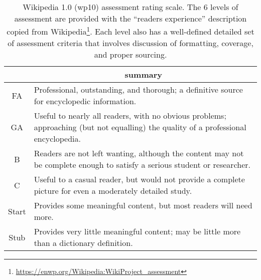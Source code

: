 \begin{table}
\centering
\caption{Wikipedia 1.0 (wp10) assessment rating scale. The 6 levels of assessment are provided with the ``readers experience'' description copied from Wikipedia\protect\footnote{\url{https://enwp.org/Wikipedia:WikiProject_assessment}}.  Each level also has a well-defined detailed set of assessment criteria that involves discussion of formatting, coverage, and proper sourcing.}
\begin{tabular}{|c|p{7cm}|} \hline
& \multicolumn{1}{|c|}{summary} \\
\hline
FA & Professional, outstanding, and thorough; a definitive source for
encyclopedic information.\\ \hline
GA & Useful to nearly all readers, with no obvious problems; approaching
(but not equalling) the quality of a professional
encyclopedia.\\ \hline
B & Readers are not left wanting, although the content may not be
complete enough to satisfy a serious student or
researcher.\\ \hline
C & Useful to a casual reader, but would not provide a complete picture
for even a moderately detailed study.\\ \hline
Start & Provides some meaningful content, but most readers will need
more.\\ \hline
Stub & Provides very little meaningful content; may be little more than
a dictionary definition.\\ \hline
\end{tabular}
\label{tab:assessment_scale}
\end{table}
